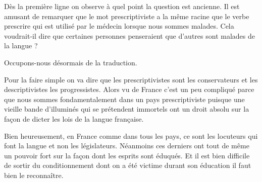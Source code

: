 Dès la première ligne on observe à quel point la question est
ancienne. Il est amusant de remarquer que le mot prescriptiviste a la
même racine que le verbe prescrire qui est utilisé par le médecin
lorsque nous sommes malades. Cela voudrait-il dire que certaines
personnes penseraient que d'autres sont malades de la langue ?

Occupons-nous désormais de la traduction.

\begin{center}
\begin{mdframed}[style=tradstyle, frametitle={\exFR{Traduction} de l'extrait précédent}]
\end{mdframed}  
\end{center}


Pour la faire simple on va dire que les prescriptivistes sont les
conservateurs et les descriptivistes les progressistes. Alors vu de
France c'est un peu compliqué parce que nous sommes fondamentalement
dans un pays prescriptiviste puisque une vieille bande d'illuminés
qui se prétendent immortels ont un droit absolu sur la façon de dicter
les lois de la langue française.

Bien heureusement, en France comme dans tous les pays, ce sont les
locuteurs qui font la langue et non les législateurs. Néanmoins ces
derniers ont tout de même un pouvoir fort sur la façon dont les
esprits sont éduqués. Et il est bien difficile de sortir du
conditionnement dont on a été victime durant son éducation il faut
bien le reconnaître.

